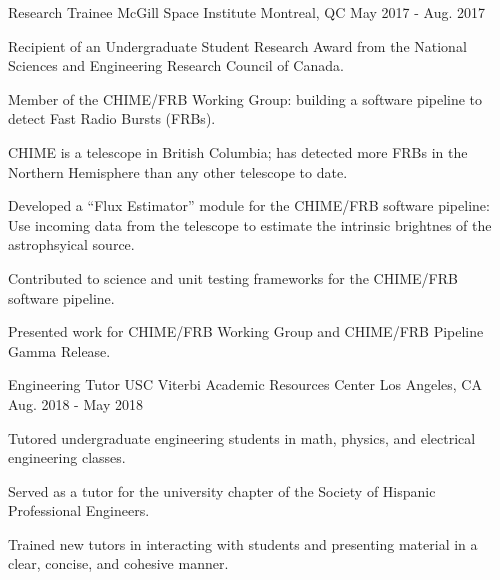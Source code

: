 \begin{cventries}
  \cventry
    {Research Trainee} %
    {McGill Space Institute} %
    {Montreal, QC} %
    {May 2017 - Aug. 2017} %
    {
      \begin{cvitems} %
        \item {Recipient of an Undergraduate Student Research Award from the National Sciences and Engineering Research Council of Canada.}
        \item {Member of the CHIME/FRB Working Group: building a software pipeline to detect Fast Radio Bursts (FRBs).}
        \item {CHIME is a telescope in British Columbia; has detected more FRBs in the Northern Hemisphere than any other telescope to date.}
        \item {Developed a ``Flux Estimator'' module for the CHIME/FRB software pipeline: Use incoming data from the telescope to estimate the intrinsic brightnes of the astrophsyical source.}
        \item {Contributed to science and unit testing frameworks for the CHIME/FRB software pipeline.}
        \item {Presented work for CHIME/FRB Working Group and CHIME/FRB Pipeline Gamma Release.}
      \end{cvitems}
    }

  \cventry
    {Engineering Tutor} %
    {USC Viterbi Academic Resources Center} %
    {Los Angeles, CA} %
    {Aug. 2018 - May 2018} %
    {
      \begin{cvitems} %
        \item {Tutored undergraduate engineering students in math, physics, and electrical engineering classes.}
        \item {Served as a tutor for the university chapter of the Society of Hispanic Professional Engineers.}
        \item {Trained new tutors in interacting with students and presenting material in a clear, concise, and cohesive manner.}
      \end{cvitems}
    }


\end{cventries}
